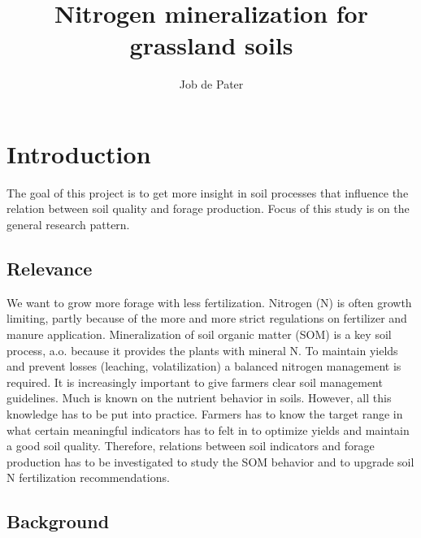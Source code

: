 \documentclass[10pt,twoside,dutch,english]{report}
\author{Job de Pater}
\title{Nitrogen mineralization for grassland soils } %
\begin{document}
\maketitle


\setcounter{tocdepth}{1}
\tableofcontents

\thispagestyle{empty}
\pagebreak
{}



\chapter{Introduction}
The goal of this project is to get more insight in soil processes that influence the relation between soil quality and forage production. Focus of this study is on the general research pattern. 

	\section{Relevance}
	We want to grow more forage with less fertilization. Nitrogen (N) is often growth limiting, partly because of the more and more strict regulations on fertilizer and manure application. Mineralization of soil organic matter (SOM) is a key soil process, a.o. because it provides the plants with mineral N. To maintain yields and prevent losses (leaching, volatilization) a balanced nitrogen management is required. It is increasingly important to give farmers clear soil management guidelines. Much is known on the nutrient behavior in soils. However, all this knowledge has to be put into practice. Farmers has to know the target range in what certain meaningful indicators has to felt in to optimize yields and maintain a good soil quality. Therefore, relations between soil indicators and forage production has to be investigated to study the SOM behavior and to upgrade soil N fertilization recommendations. 
	
	
		\section{Background} %
	
\end{document}
